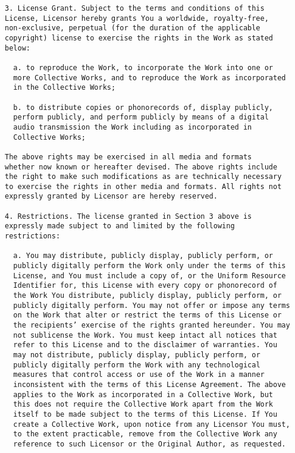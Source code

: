 \begin{Verbatim}[fontsize=\footnotesize]
3. License Grant. Subject to the terms and conditions of this
License, Licensor hereby grants You a worldwide, royalty-free,
non-exclusive, perpetual (for the duration of the applicable
copyright) license to exercise the rights in the Work as stated
below:

  a. to reproduce the Work, to incorporate the Work into one or
  more Collective Works, and to reproduce the Work as incorporated
  in the Collective Works;
  
  b. to distribute copies or phonorecords of, display publicly,
  perform publicly, and perform publicly by means of a digital
  audio transmission the Work including as incorporated in
  Collective Works;

The above rights may be exercised in all media and formats
whether now known or hereafter devised. The above rights include
the right to make such modifications as are technically necessary
to exercise the rights in other media and formats. All rights not
expressly granted by Licensor are hereby reserved.

4. Restrictions. The license granted in Section 3 above is
expressly made subject to and limited by the following
restrictions:

  a. You may distribute, publicly display, publicly perform, or
  publicly digitally perform the Work only under the terms of this
  License, and You must include a copy of, or the Uniform Resource
  Identifier for, this License with every copy or phonorecord of
  the Work You distribute, publicly display, publicly perform, or
  publicly digitally perform. You may not offer or impose any terms
  on the Work that alter or restrict the terms of this License or
  the recipients’ exercise of the rights granted hereunder. You may
  not sublicense the Work. You must keep intact all notices that
  refer to this License and to the disclaimer of warranties. You
  may not distribute, publicly display, publicly perform, or
  publicly digitally perform the Work with any technological
  measures that control access or use of the Work in a manner
  inconsistent with the terms of this License Agreement. The above
  applies to the Work as incorporated in a Collective Work, but
  this does not require the Collective Work apart from the Work
  itself to be made subject to the terms of this License. If You
  create a Collective Work, upon notice from any Licensor You must,
  to the extent practicable, remove from the Collective Work any
  reference to such Licensor or the Original Author, as requested.
  

\end{Verbatim}
